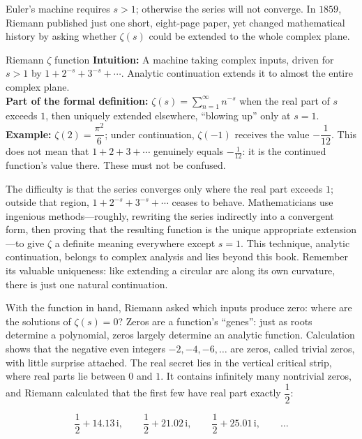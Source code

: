 Euler's machine requires $s>1$; otherwise the series will not converge. In $1859$, Riemann published just one short, eight-page paper, yet changed mathematical history by asking whether $\zeta(s)$ could be extended to the whole complex plane.

\begin{shuyu}{Riemann $\zeta$ function}
\textbf{Intuition:} A machine taking complex inputs, driven for $s>1$ by $1+2^{-s}+3^{-s}+\cdots$. Analytic continuation extends it to almost the entire complex plane.\\
\textbf{Part of the formal definition:} $\zeta(s)=\sum_{n=1}^{\infty} n^{-s}$ when the real part of $s$ exceeds $1$, then uniquely extended elsewhere, ``blowing up'' only at $s=1$.\\
\textbf{Example:} $\zeta(2)=\dfrac{\pi^{2}}{6}$; under continuation, $\zeta(-1)$ receives the value $-\dfrac{1}{12}$. This does not mean that $1+2+3+\cdots$ genuinely equals $-\frac{1}{12}$: it is the continued function's value there. These must not be confused.
\end{shuyu}

The difficulty is that the series converges only where the real part exceeds $1$; outside that region, $1+2^{-s}+3^{-s}+\cdots$ ceases to behave. Mathematicians use ingenious methods---roughly, rewriting the series indirectly into a convergent form, then proving that the resulting function is the unique appropriate extension---to give $\zeta$ a definite meaning everywhere except $s=1$. This technique, analytic continuation, belongs to complex analysis and lies beyond this book. Remember its valuable uniqueness: like extending a circular arc along its own curvature, there is just one natural continuation.

With the function in hand, Riemann asked which inputs produce zero: where are the solutions of $\zeta(s)=0$? Zeros are a function's ``genes'': just as roots determine a polynomial, zeros largely determine an analytic function. Calculation shows that the negative even integers $-2,-4,-6,\dots$ are zeros, called trivial zeros, with little surprise attached. The real secret lies in the vertical critical strip, where real parts lie between $0$ and $1$. It contains infinitely many nontrivial zeros, and Riemann calculated that the first few have real part exactly $\dfrac12$:

\[
\frac12+14.13\,\mathrm{i},\qquad
\frac12+21.02\,\mathrm{i},\qquad
\frac12+25.01\,\mathrm{i},\qquad\dots
\]

